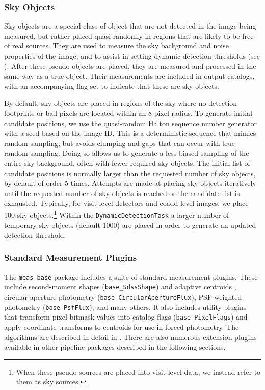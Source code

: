 \subsubsection{Sky Objects}
\label{sec:sky-objects}

Sky objects are a special class of object that are not detected in the image being measured, but rather placed quasi-randomly in regions that are likely to be free of real sources.
They are used to measure the sky background and noise properties of the image, and to assist in setting dynamic detection thresholds (see ).
After these pseudo-objects are placed, they are measured and processed in the same way as a true object.
Their measurements are included in output catalogs, with an accompanying flag set to indicate that these are sky objects.

By default, sky objects are placed in regions of the sky where no detection footprints or bad pixels are located within an 8-pixel radius.
To generate initial candidate positions, we use the quasi-random Halton sequence number generator with a seed based on the image ID.
This is a deterministic sequence that mimics random sampling, but avoids clumping and gaps that can occur with true random sampling.
Doing so allows us to generate a less biased sampling of the entire sky background, often with fewer required sky objects.
The initial list of candidate positions is normally larger than the requested number of sky objects, by default of order 5 times.
Attempts are made at placing sky objects iteratively until the requested number of sky objects is reached or the candidate list is exhausted.
Typically, for visit-level detectors and coadd-level images, we place 100 sky objects.\footnote{When these pseudo-sources are placed into visit-level data, we instead refer to them as sky sources.}
Within the \texttt{DynamicDetectionTask} a larger number of temporary sky objects (default 1000) are placed in order to generate an updated detection threshold.

\subsubsection{Standard Measurement Plugins}
\label{sec:standard-plugins}

The \texttt{meas\_base} package includes a suite of standard measurement plugins.
These include second-moment shapes (\texttt{base\_SdssShape}) and adaptive centroids \citep[\texttt{base\_SdssCentroid}]{2003AJ....125.1559P}, circular aperture photometry (\texttt{base\_CircularApertureFlux}), PSF-weighted photometry (\texttt{base\_PsfFlux}), and many others.
It also includes utility plugins that transform pixel bitmask values into catalog flags (\texttt{base\_PixelFlags}) and apply coordinate transforms to centroids for use in forced photometry.
The algorithms are described in detail in \citet{2018PASJ...70S...5B}.
There are also numerous extension plugins available in other pipeline packages described in the following sections.







